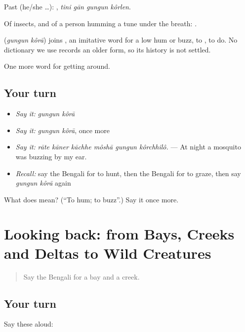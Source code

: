 Past (he/she …):    , \emph{tini gān gungun kôrlen}.

Of insects, and of a person humming a tune under the breath:   .

\begin{cousinweb}
\textbf{ } (\emph{gungun kôrā}) joins , an imitative word for a low hum or buzz, to , to do. No dictionary we use records an older form, so its history is not settled.
\end{cousinweb}

\begin{grammarlens}[title={What you've built}]
One more word for getting around.
\end{grammarlens}

\subsection*{Your turn}
\begin{itemize}
\raggedright
  \item \emph{Say it:} \emph{gungun kôrā}
  \item \emph{Say it:} \emph{gungun kôrā}, once more
  \item \emph{Say it:} \emph{rāte kāner kāchhe môshā gungun kôrchhilô.} — At night a mosquito was buzzing by my ear.
  \item \emph{Recall:} say the Bengali for to hunt, then the Bengali for to graze, then say \emph{gungun kôrā} again
\end{itemize}

\begin{tcolorbox}[breakable,colback=teal!4,colframe=teal!35!black,title={Before you move on}]
What does   mean? (\textquotedblleft{}To hum; to buzz\textquotedblright{}.) Say it once more.
\end{tcolorbox}
\section[(dialogue)]{Looking back: from Bays, Creeks and Deltas to Wild Creatures}

\label{lesson:BN-R437-review-431-437}



\begin{quote}
Say the Bengali for a bay and a creek.
\end{quote}

\subsection*{Your turn}
Say these aloud:

